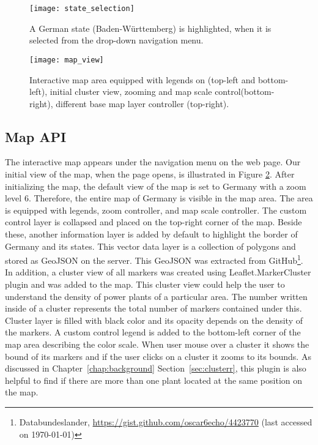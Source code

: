\begin{figure}
  \begin{center}
    \texttt{[image: state\_selection]}
    \caption[A German state (Baden-Württemberg) is highlighted]{A German state (Baden-Württemberg) is highlighted, when it is selected from the drop-down navigation menu.}
    \label{fig:stateSelection}
  \end{center}
\end{figure}

\begin{figure}
  \begin{center}
    \texttt{[image: map\_view]}
    \caption[Interactive map area]{Interactive map area equipped with legends on (top-left and bottom-left), initial cluster view, zooming and map scale control(bottom-right), different base map layer controller (top-right).}
    \label{fig:mapView}
  \end{center}
\end{figure}

\subsection{Map API}
\label{sssec:mapArea}

The interactive map appears under the navigation menu on the web page. Our initial view of the map, when the page opens, is illustrated in Figure \ref{fig:mapView}. After initializing the map, the default view of the map is set to Germany with a zoom level 6. Therefore, the entire map of Germany is visible in the map area. The area is equipped with legends, zoom controller, and map scale controller. The custom control layer is collapsed and placed on the top-right corner of the map. Beside these, another information layer is added by default to highlight the border of Germany and its states. This vector data layer is a collection of polygons and stored as GeoJSON on the server. This GeoJSON was extracted from GitHub\footnote{Databundeslander, \url{https://gist.github.com/oscar6echo/4423770} (last accessed on \today)}. In addition, a cluster view of all markers was created using Leaflet.MarkerCluster plugin and was added to the map. This cluster view could help the user to understand the density of power plants of a particular area. The number written inside of a cluster represents the total number of markers contained under this. Cluster layer is filled with black color and its opacity depends on the density of the markers. A custom control legend is added to the bottom-left corner of the map area describing the color scale. When user mouse over a cluster it shows the bound of its markers and if the user clicks on a cluster it zooms to its bounds. As discussed in Chapter~\ref{chap:background} Section~\ref{sec:clusterr}, this plugin is also helpful to find if there are more than one plant located at the same position on the map.

